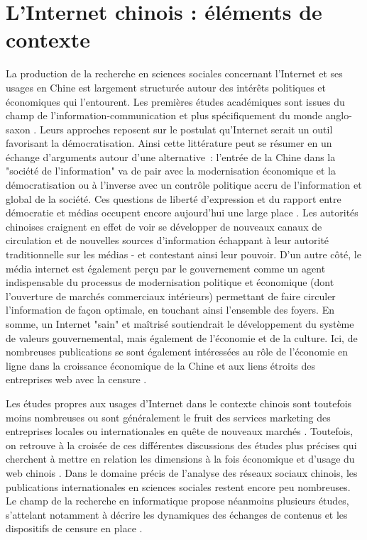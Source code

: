\section{L’Internet chinois : éléments de contexte }
La production de la recherche en sciences sociales concernant l’Internet et ses usages en Chine est largement structurée autour des intérêts politiques et économiques qui l’entourent. Les premières études académiques sont issues du champ de l’information-communication et plus spécifiquement du monde anglo-saxon \citep{Reference}. Leurs approches reposent sur le postulat qu'Internet serait un outil favorisant la démocratisation. Ainsi cette littérature peut se résumer en un échange d'arguments autour d'une alternative : l'entrée de la Chine dans la "société de l'information" va de pair avec la modernisation économique et la démocratisation ou à l’inverse avec un contrôle politique accru de l'information et global de la société. Ces questions de liberté d’expression et du rapport entre démocratie et médias occupent encore aujourd’hui une large place \citep{MacKinnon2009, Douzet2007, Yang2008}. Les autorités chinoises craignent en effet de voir se développer de nouveaux canaux de circulation et de nouvelles sources d'information échappant à leur autorité traditionnelle sur les médias - et contestant ainsi leur pouvoir. D'un autre côté, le média internet est également perçu par le gouvernement comme un agent indispensable du processus de modernisation politique et économique (dont l’ouverture de marchés commerciaux intérieurs) permettant de faire circuler l’information de façon optimale, en touchant ainsi l’ensemble des foyers. En somme, un Internet "sain" et maîtrisé soutiendrait le développement du système de valeurs gouvernemental, mais également de l’économie et de la culture. Ici, de nombreuses publications se sont également intéressées au rôle de l’économie en ligne dans la croissance économique de la Chine et aux liens étroits des entreprises web avec la censure \citep{Dann2008}.

Les études propres aux usages d’Internet dans le contexte chinois sont toutefois moins nombreuses ou sont généralement le fruit des services marketing des entreprises locales ou internationales en quête de nouveaux marchés \citep{Hwang2005, Bergstrom2012}. Toutefois, on retrouve à la croisée de ces différentes discussions des études plus précises qui cherchent à mettre en relation les dimensions à la fois économique et d’usage du web chinois \citep{Puel2009, Fernandez2010, Shen2012}. Dans le domaine précis de l’analyse des réseaux sociaux chinois, les publications internationales en sciences sociales restent encore peu nombreuses. Le champ de la recherche en informatique propose néanmoins plusieurs études, s’attelant notamment à décrire les dynamiques des échanges de contenus \citep{Yu2011} et les dispositifs de censure en place \citep{Reference}. 

